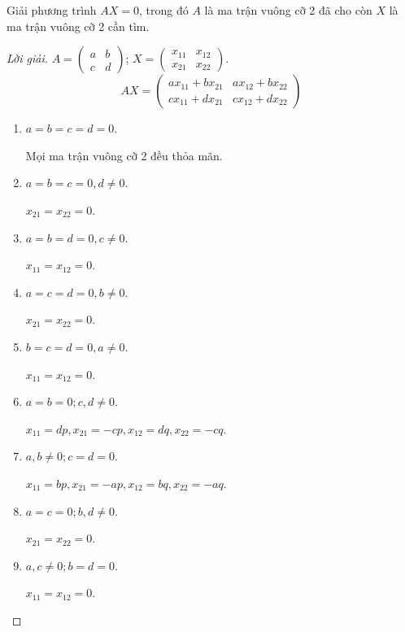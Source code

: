 \documentclass[class=linearalgebra,crop=false]{standalone}
\begin{document}
\begin{exercise}
    Giải phương trình $AX = 0$, trong đó $A$ là ma trận vuông cỡ 2 đã cho còn $X$ là ma trận vuông cỡ 2 cần tìm.
\end{exercise}

\begin{proof}[Lời giải]
    $A = \begin{pmatrix}a & b \\ c & d\end{pmatrix}$; $X = \begin{pmatrix}x_{11} & x_{12} \\ x_{21} & x_{22}\end{pmatrix}$.
    \[
        AX =
        \begin{pmatrix}
            ax_{11}+bx_{21} & ax_{12}+bx_{22} \\
            cx_{11}+dx_{21} & cx_{12}+dx_{22}
        \end{pmatrix}
    \]
    \begin{enumerate}[label = Trường hợp \arabic*:,itemindent=2cm]
        \item $a = b = c = d = 0$.
              \par Mọi ma trận vuông cỡ 2 đều thỏa mãn.
        \item $a = b = c = 0, d\ne 0$.
              \par $x_{21} = x_{22} = 0$.
        \item $a = b = d = 0, c\ne 0$.
              \par $x_{11} = x_{12} = 0$.
        \item $a = c = d = 0, b\ne 0$.
              \par $x_{21} = x_{22} = 0$.
        \item $b = c = d = 0, a\ne 0$.
              \par $x_{11} = x_{12} = 0$.
        \item $a = b = 0; c, d\ne 0$.
              \par $x_{11} = dp, x_{21} = -cp, x_{12} = dq, x_{22} = -cq$.
        \item $a, b\ne 0; c = d = 0$.
              \par $x_{11} = bp, x_{21} = -ap, x_{12} = bq, x_{22} = -aq$.
        \item $a = c = 0; b, d\ne 0$.
              \par $x_{21} = x_{22} = 0$.
        \item $a, c\ne 0; b = d = 0$.
              \par $x_{11} = x_{12} = 0$.

\end{enumerate}
\end{proof}
\end{document}
